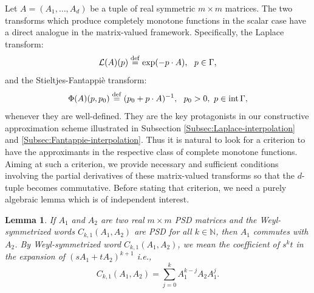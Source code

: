 \documentclass[11pt,reqno]{amsart}
\theoremstyle{plain}
\newtheorem{lemma}[theorem]{Lemma}
\theoremstyle{definition}
\numberwithin{equation}{section}
\newcommand{\bydef}{\stackrel{\rm def}{=}}
\begin{document}
Let $A = (A_1, \ldots,A_d)$ be a tuple of real symmetric $m \times m$ matrices. The two transforms which
produce completely monotone functions in the scalar case have a direct analogue in the matrix-valued framework. Specifically, the Laplace transform:
$$ {\mathcal L}(A)(p) \bydef \exp (- p \cdot A),\ \ p \in \Gamma,$$
and the Stieltjes-Fantappi\`e transform:
$$ \Phi(A)(p, p_0) \bydef (p_0 + p\cdot A)^{-1},\ \ p_0 > 0, \ p\in \operatorname{int} \Gamma,$$
whenever they are well-defined. They are the key protagonists in our constructive approximation scheme illustrated in Subsection \ref{Subsec:Laplace-interpolation} and \ref{Subsec:Fantappie-interpolation}. Thus it is natural to look for a criterion to have the approximants in the respective class of complete monotone functions.
Aiming at such a criterion, we provide necessary and sufficient conditions involving the partial derivatives of these matrix-valued transforms so that the $d$-tuple becomes commutative. Before stating that criterion, we need a purely algebraic lemma which is of independent interest.
\begin{lemma}\label{Lem:comm}
    If $A_1$ and $A_2$ are two real $m\times m$ PSD matrices and the Weyl-symmetrized words $C_{k, 1}(A_1, A_2)$ are PSD for all $k\in \mathbb{N}$, then $A_1$ commutes with $A_2$. By Weyl-symmetrized word $C_{k, 1}(A_1, A_2)$, we mean the coefficient of $s^k t$ in the expansion of $(sA_1 + tA_2)^{k+1}$ i.e., 
    $$
    C_{k, 1}(A_1, A_2) = \sum_{j=0}^k A_1^{k-j} A_2 A_1^j.
    $$
\end{lemma}
\end{document}
